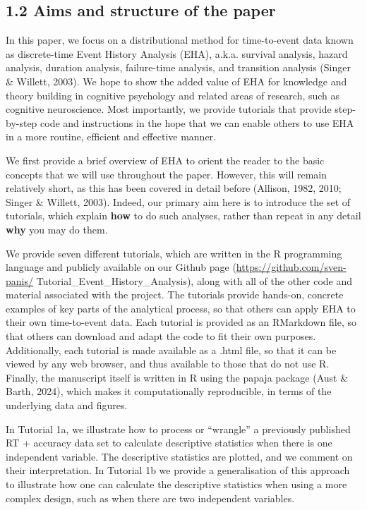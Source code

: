 \documentclass[
  man, donotrepeattitle,floatsintext]{apa6}
\begin{document}
\subsection{1.2 Aims and structure of the paper}\label{aims-and-structure-of-the-paper}

In this paper, we focus on a distributional method for time-to-event data known as discrete-time Event History Analysis (EHA), a.k.a. survival analysis, hazard analysis, duration analysis, failure-time analysis, and transition analysis (Singer \& Willett, 2003). We hope to show the added value of EHA for knowledge and theory building in cognitive psychology and related areas of research, such as cognitive neuroscience. Most importantly, we provide tutorials that provide step-by-step code and instructions in the hope that we can enable others to use EHA in a more routine, efficient and effective manner.

We first provide a brief overview of EHA to orient the reader to the basic concepts that we will use throughout the paper. However, this will remain relatively short, as this has been covered in detail before (Allison, 1982, 2010; Singer \& Willett, 2003). Indeed, our primary aim here is to introduce the set of tutorials, which explain \textbf{how} to do such analyses, rather than repeat in any detail \textbf{why} you may do them.

We provide seven different tutorials, which are written in the R programming language and publicly available on our Github page (\url{https://github.com/sven-panis/} Tutorial\_Event\_History\_Analysis), along with all of the other code and material associated with the project. The tutorials provide hands-on, concrete examples of key parts of the analytical process, so that others can apply EHA to their own time-to-event data. Each tutorial is provided as an RMarkdown file, so that others can download and adapt the code to fit their own purposes. Additionally, each tutorial is made available as a .html file, so that it can be viewed by any web browser, and thus available to those that do not use R. Finally, the manuscript itself is written in R using the papaja package (Aust \& Barth, 2024), which makes it computationally reproducible, in terms of the underlying data and figures.

In Tutorial 1a, we illustrate how to process or ``wrangle'' a previously published RT + accuracy data set to calculate descriptive statistics when there is one independent variable. The descriptive statistics are plotted, and we comment on their interpretation. In Tutorial 1b we provide a generalisation of this approach to illustrate how one can calculate the descriptive statistics when using a more complex design, such as when there are two independent variables.
\end{document}
